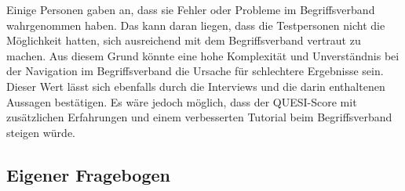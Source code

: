Einige Personen gaben an, dass sie Fehler oder Probleme im Begriffsverband wahrgenommen haben.
Das kann daran liegen, dass die Testpersonen nicht die Möglichkeit hatten, sich ausreichend mit dem Begriffsverband vertraut zu machen.
Aus diesem Grund könnte eine hohe Komplexität und Unverständnis bei der Navigation im Begriffsverband die Ursache für schlechtere Ergebnisse sein.
Dieser Wert lässt sich ebenfalls durch die Interviews und die darin enthaltenen Aussagen bestätigen.
Es wäre jedoch möglich, dass der \ac{QUESI}-Score mit zusätzlichen Erfahrungen und einem verbesserten Tutorial beim Begriffsverband steigen würde.

\subsection{Eigener Fragebogen}





